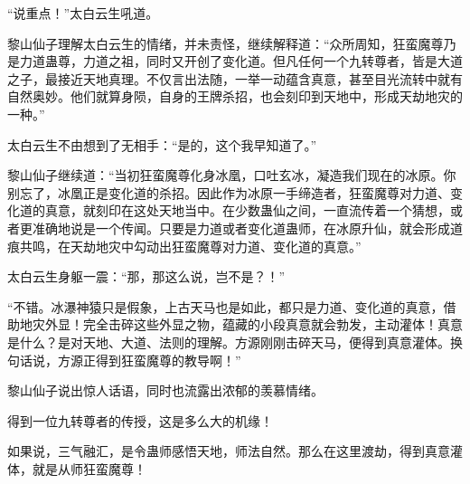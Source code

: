\begin{this_body}
“说重点！”太白云生吼道。

黎山仙子理解太白云生的情绪，并未责怪，继续解释道：“众所周知，狂蛮魔尊乃是力道蛊尊，力道之祖，同时又开创了变化道。但凡任何一个九转尊者，皆是大道之子，最接近天地真理。不仅言出法随，一举一动蕴含真意，甚至目光流转中就有自然奥妙。他们就算身陨，自身的王牌杀招，也会刻印到天地中，形成天劫地灾的一种。”

太白云生不由想到了无相手：“是的，这个我早知道了。”

黎山仙子继续道：“当初狂蛮魔尊化身冰凰，口吐玄冰，凝造我们现在的冰原。你别忘了，冰凰正是变化道的杀招。因此作为冰原一手缔造者，狂蛮魔尊对力道、变化道的真意，就刻印在这处天地当中。在少数蛊仙之间，一直流传着一个猜想，或者更准确地说是一个传闻。只要是力道或者变化道蛊师，在冰原升仙，就会形成道痕共鸣，在天劫地灾中勾动出狂蛮魔尊对力道、变化道的真意。”

太白云生身躯一震：“那，那这么说，岂不是？！”

“不错。冰瀑神猿只是假象，上古天马也是如此，都只是力道、变化道的真意，借助地灾外显！完全击碎这些外显之物，蕴藏的小段真意就会勃发，主动灌体！真意是什么？是对天地、大道、法则的理解。方源刚刚击碎天马，便得到真意灌体。换句话说，方源正得到狂蛮魔尊的教导啊！”

黎山仙子说出惊人话语，同时也流露出浓郁的羡慕情绪。

得到一位九转尊者的传授，这是多么大的机缘！

如果说，三气融汇，是令蛊师感悟天地，师法自然。那么在这里渡劫，得到真意灌体，就是从师狂蛮魔尊！

\end{this_body}

